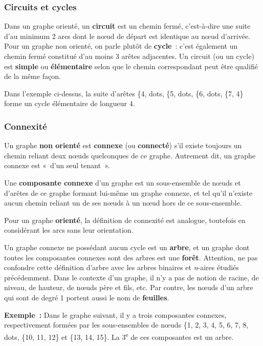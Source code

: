 		\subsubsection{Circuits et cycles}
			
			Dans un graphe orienté, un \textbf{circuit} est un chemin fermé, 
			c'est-à-dire une suite d'au minimum 2 arcs dont le n{\oe}ud de 
			départ est identique au n{\oe}ud d'arrivée. Pour un graphe non 
			orienté, on parle plutôt de \textbf{cycle}~:
			c'est également un chemin fermé constitué d'au moins 3 arêtes 
			adjacentes. Un circuit (ou un cycle) est \textbf{simple}
			ou \textbf{élémentaire} selon que le chemin correspondant 
			peut être qualifié de la même façon.

			Dans l'exemple ci-dessus, la suite d'arêtes 
			\{4, {dots}, \{5, {dots}, \{6, {dots}, \{7, 4\} 
			forme un cycle élémentaire de	longueur 4.

		\subsubsection{Connexité}
		
		Un graphe \textbf{non orienté} est \textbf{connexe} 
		(ou \textbf{connecté}) s'il existe toujours un chemin 
		reliant deux n{\oe}uds quelconques de ce graphe. 
		Autrement dit, un graphe connexe est «~d'un seul tenant~».

		Une \textbf{composante connexe} d'un graphe est un sous-ensemble 
		de n{\oe}uds et d'arêtes de ce graphe formant lui-même
		un graphe connexe, et tel qu'il n'existe aucun chemin reliant 
		un de ses n{\oe}uds à un n{\oe}ud hors de ce sous-ensemble.

		Pour un graphe \textbf{orienté}, la définition de connexité est 
		analogue, toutefois en considérant les arcs sans leur orientation.

		Un graphe connexe ne possédant aucun cycle est un \textbf{arbre}, 
		et un graphe dont toutes les composantes connexes sont des arbres 
		est une \textbf{forêt}. Attention, ne pas confondre cette 
		définition d'arbre avec les arbres binaires et \textit{n}-aires 
		étudiés précédemment. Dans le contexte d'un graphe, il n'y a pas 
		de notion de racine, de niveau, de hauteur, de n{\oe}uds père et fils, etc. 
		Par contre, les n{\oe}uds d'un arbre qui sont de degré 1 portent aussi le
		nom de \textbf{feuilles}.

		\textbf{Exemple~:} Dans le graphe suivant, il y a trois composantes 
		connexes, respectivement formées par les sous-ensembles de n{\oe}uds 
		\{1, 2, 3, 4, 5, 6, 7, 8, {dots}, \{10, 11, 12\} et \{13, 14, 15\}. 
		La 3\textsuperscript{e} de ces composantes est un arbre.

